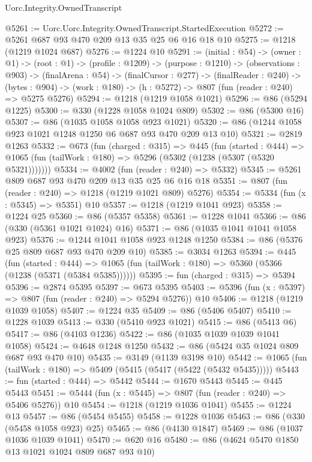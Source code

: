 \begin{lexlean}{Uorc.Integrity.OwnedTranscript}
\begin{coremodule}
@5261 := Uorc.Uorc.Integrity.OwnedTranscript.StartedExecution
@5272 := @5261 @687 @93 @470 @209 @13 @35 @25 @6 @16 @18 @10
@5275 := @1218 (@1219 @1024 @687)
@5276 := @1224 @10
@5291 := (initial : @54) ->
  (owner : @1) ->
  (root : @1) ->
  (profile : @1209) ->
  (purpose : @1210) ->
  (observations : @903) ->
  (finalArena : @54) ->
  (finalCursor : @277) ->
  (finalReader : @240) ->
  (bytes : @904) -> (work : @180) -> (h : @5272) -> @807 (fun (reader : @240) => @5275 @5276)
@5294 := @1218 (@1219 @1058 @1021)
@5296 := @86 (@5294 @1225)
@5300 := @330 (@1228 @1058 @1024 @809)
@5302 := @86 (@5300 @16)
@5307 := @86 (@1035 @1058 @1058 @923 @1021)
@5320 := @86 (@1244 @1058 @923 @1021 @1248 @1250 @6 @687 @93 @470 @209 @13 @10)
@5321 := @2819 @1263
@5332 := @673
    (fun (charged : @315) =>
    @445
      (fun (started : @444) =>
      @1065 (fun (tailWork : @180) => @5296 (@5302 (@1238 (@5307 (@5320 @5321)))))))
@5334 := @4002 (fun (reader : @240) => @5332)
@5345 := @5261 @809 @687 @93 @470 @209 @13 @35 @25 @6 @16 @18
@5351 := @807 (fun (reader : @240) => @1218 (@1219 @1021 @809) @5276)
@5354 := @5334 (fun (x : @5345) => @5351) @10
@5357 := @1218 (@1219 @1041 @923)
@5358 := @1224 @25
@5360 := @86 (@5357 @5358)
@5361 := @1228 @1041
@5366 := @86 (@330 (@5361 @1021 @1024) @16)
@5371 := @86 (@1035 @1041 @1041 @1058 @923)
@5376 := @1244 @1041 @1058 @923 @1248 @1250
@5384 := @86 (@5376 @25 @809 @687 @93 @470 @209 @10)
@5385 := @3034 @1263
@5394 := @445
    (fun (started : @444) =>
    @1065 (fun (tailWork : @180) => @5360 (@5366 (@1238 (@5371 (@5384 @5385))))))
@5395 := fun (charged : @315) => @5394
@5396 := @2874 @5395
@5397 := @673 @5395
@5403 := @5396 (fun (x : @5397) => @807 (fun (reader : @240) => @5294 @5276)) @10
@5406 := @1218 (@1219 @1039 @1058)
@5407 := @1224 @35
@5409 := @86 (@5406 @5407)
@5410 := @1228 @1039
@5413 := @330 (@5410 @923 @1021)
@5415 := @86 (@5413 @6)
@5417 := @86 (@4103 @1236)
@5422 := @86 (@1035 @1039 @1039 @1041 @1058)
@5424 := @4648 @1248 @1250
@5432 := @86 (@5424 @35 @1024 @809 @687 @93 @470 @10)
@5435 := @3149 (@1139 @3198 @10)
@5442 := @1065 (fun (tailWork : @180) => @5409 (@5415 (@5417 (@5422 (@5432 @5435)))))
@5443 := fun (started : @444) => @5442
@5444 := @1670 @5443
@5445 := @445 @5443
@5451 := @5444 (fun (x : @5445) => @807 (fun (reader : @240) => @5406 @5276)) @10
@5454 := @1218 (@1219 @1036 @1041)
@5455 := @1224 @13
@5457 := @86 (@5454 @5455)
@5458 := @1228 @1036
@5463 := @86 (@330 (@5458 @1058 @923) @25)
@5465 := @86 (@4130 @1847)
@5469 := @86 (@1037 @1036 @1039 @1041)
@5470 := @620 @16
@5480 := @86 (@4624 @5470 @1850 @13 @1021 @1024 @809 @687 @93 @10)

\end{coremodule}
\end{lexlean}

